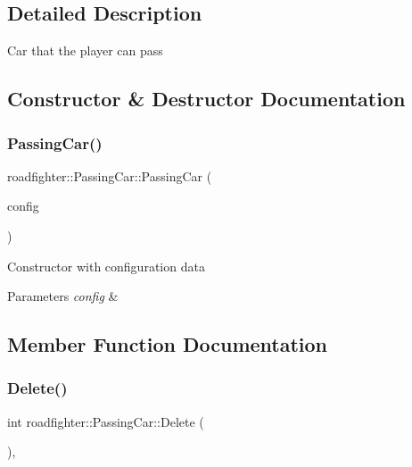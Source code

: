 \subsection{Detailed Description}
Car that the player can pass 

\subsection{Constructor \& Destructor Documentation}
\mbox{\label{classroadfighter_1_1PassingCar_a2f3ae2000521dabcd282f9538b0c87be}} 
\subsubsection{\texorpdfstring{Passing\+Car()}{PassingCar()}}
{\footnotesize\ttfamily roadfighter\+::\+Passing\+Car\+::\+Passing\+Car (\begin{DoxyParamCaption}\item[{std\+::shared\+\_\+ptr$<$ \hyperlink{classConfigData}{Config\+Data} $>$}]{config }\end{DoxyParamCaption})}

Constructor with configuration data 
\begin{DoxyParams}{Parameters}
{\em config} & \\
\hline
\end{DoxyParams}


\subsection{Member Function Documentation}
\mbox{\label{classroadfighter_1_1PassingCar_a1a2838de0992a6e46793d0fe0f128b36}} 
\subsubsection{\texorpdfstring{Delete()}{Delete()}}
{\footnotesize\ttfamily int roadfighter\+::\+Passing\+Car\+::\+Delete (\begin{DoxyParamCaption}{ }\end{DoxyParamCaption})\hspace{0.3cm}{\ttfamily [override]}, {\ttfamily [virtual]}}

